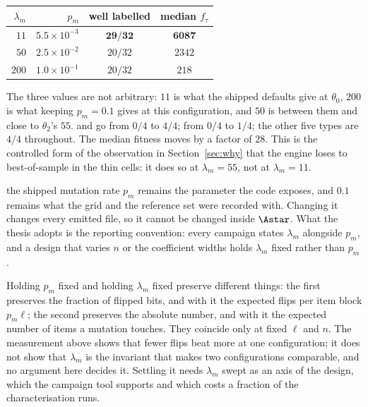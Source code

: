 \begin{center}\small
\begin{tabular}{@{}rrcc@{}}
\toprule
$\lambda_m$ & $p_m$ & well labelled & median $f_\tau$ \\
\midrule
$11$  & $5.5\times10^{-3}$ & $\mathbf{29/32}$ & $\mathbf{6087}$ \\
$50$  & $2.5\times10^{-2}$ & $20/32$ & $2342$ \\
$200$ & $1.0\times10^{-1}$ & $20/32$ & $218$ \\
\bottomrule
\end{tabular}
\end{center}

The three values are not arbitrary: $11$ is what the shipped defaults give at $\theta_0$,
$200$ is what keeping $p_m=0.1$ gives at this configuration, and $50$ is between them and
close to $\theta_2$'s $55$.  and  go from $0/4$ to
$4/4$;  from $0/4$ to $1/4$; the other five types are $4/4$
throughout. The median fitness moves by a factor of $28$. This is the controlled form of the
observation in Section~\ref{sec:why} that the engine loses to best-of-sample in the thin
cells: it does so at $\lambda_m=55$, not at $\lambda_m=11$.

\begin{kept}{the shipped mutation rate}
$p_m$ remains the parameter the code exposes, and $0.1$ remains what the grid and the
reference set were recorded with. Changing it changes every emitted file, so it cannot be
changed inside $\Astar$. What the thesis adopts is the reporting convention: every campaign
states $\lambda_m$ alongside $p_m$, and a design that varies $n$ or the coefficient widths
holds $\lambda_m$ fixed rather than $p_m$.
\end{kept}

\begin{remark}\label{rem:lambdaopen}
Holding $p_m$ fixed and holding $\lambda_m$ fixed preserve different things: the first
preserves the fraction of flipped bits, and with it the expected flips per item block
$p_m\ell$; the second preserves the absolute number, and with it the expected number of items
a mutation touches. They coincide only at fixed $\ell$ and $n$. The measurement above shows
that fewer flips beat more at one configuration; it does not show that $\lambda_m$ is the
invariant that makes two configurations comparable, and no argument here decides it. Settling
it needs $\lambda_m$ swept as an axis of the design, which the campaign tool supports and
which costs a fraction of the characterisation runs.
\end{remark}

